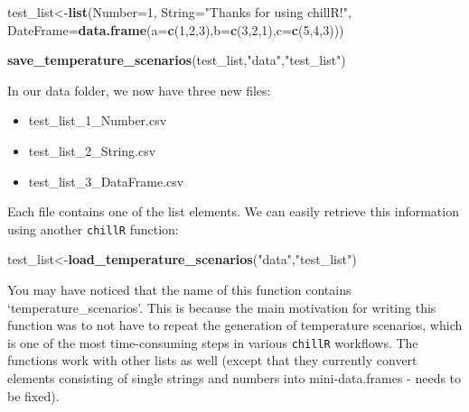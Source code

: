 \documentclass[
]{book}
\newenvironment{Shaded}{\begin{snugshade}}{\end{snugshade}}
\newcommand{\DataTypeTok}[1]{\textcolor[rgb]{0.13,0.29,0.53}{#1}}
\newcommand{\DecValTok}[1]{\textcolor[rgb]{0.00,0.00,0.81}{#1}}
\newcommand{\KeywordTok}[1]{\textcolor[rgb]{0.13,0.29,0.53}{\textbf{#1}}}
\newcommand{\NormalTok}[1]{#1}
\newcommand{\StringTok}[1]{\textcolor[rgb]{0.31,0.60,0.02}{#1}}
\providecommand{\tightlist}{%
  \setlength{\itemsep}{0pt}\setlength{\parskip}{0pt}}
\begin{document}
\begin{Shaded}
\begin{Highlighting}[]
\NormalTok{test_list<-}\KeywordTok{list}\NormalTok{(}\DataTypeTok{Number=}\DecValTok{1}\NormalTok{,}
                \DataTypeTok{String=}\StringTok{"Thanks for using chillR!"}\NormalTok{,}
                \DataTypeTok{DateFrame=}\KeywordTok{data.frame}\NormalTok{(}\DataTypeTok{a=}\KeywordTok{c}\NormalTok{(}\DecValTok{1}\NormalTok{,}\DecValTok{2}\NormalTok{,}\DecValTok{3}\NormalTok{),}\DataTypeTok{b=}\KeywordTok{c}\NormalTok{(}\DecValTok{3}\NormalTok{,}\DecValTok{2}\NormalTok{,}\DecValTok{1}\NormalTok{),}\DataTypeTok{c=}\KeywordTok{c}\NormalTok{(}\DecValTok{5}\NormalTok{,}\DecValTok{4}\NormalTok{,}\DecValTok{3}\NormalTok{)))}

\KeywordTok{save_temperature_scenarios}\NormalTok{(test_list,}\StringTok{"data"}\NormalTok{,}\StringTok{"test_list"}\NormalTok{)}
\end{Highlighting}
\end{Shaded}

In our data folder, we now have three new files:

\begin{itemize}
\tightlist
\item
  test\_list\_1\_Number.csv
\item
  test\_list\_2\_String.csv
\item
  test\_list\_3\_DataFrame.csv
\end{itemize}

Each file contains one of the list elements. We can easily retrieve this information using another \texttt{chillR} function:

\begin{Shaded}
\begin{Highlighting}[]
\NormalTok{test_list<-}\KeywordTok{load_temperature_scenarios}\NormalTok{(}\StringTok{"data"}\NormalTok{,}\StringTok{"test_list"}\NormalTok{)}
\end{Highlighting}
\end{Shaded}

You may have noticed that the name of this function contains `temperature\_scenarios'. This is because the main motivation for writing this function was to not have to repeat the generation of temperature scenarios, which is one of the most time-consuming steps in various \texttt{chillR} workflows. The functions work with other lists as well (except that they currently convert elements consisting of single strings and numbers into mini-data.frames - needs to be fixed).
\end{document}
